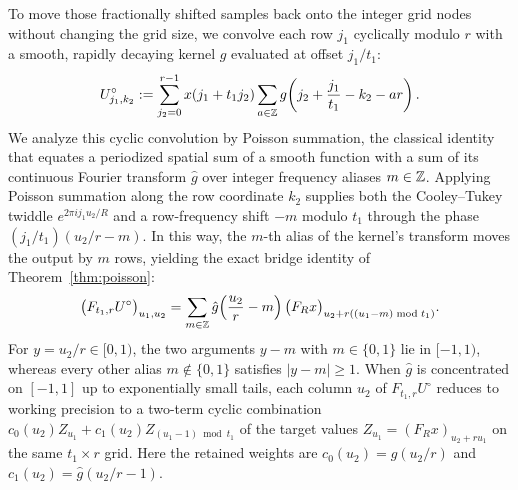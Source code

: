 To move those fractionally shifted samples back onto the integer grid nodes without changing the grid size, we convolve each row $j_1$ cyclically modulo $r$ with a smooth, rapidly decaying kernel $g$ evaluated at offset $j_1 / t_1$:
\[
  U^\circ_{j_1, k_2} := \sum_{j_2=0}^{r-1} x(j_1 + t_1 j_2) \sum_{a \in \mathbb{Z}} g\!\left(j_2 + \frac{j_1}{t_1} - k_2 - a r\right).
\]
We analyze this cyclic convolution by Poisson summation, the classical identity that equates a periodized spatial sum of a smooth function with a sum of its continuous Fourier transform $\hat{g}$ over integer frequency aliases $m \in \mathbb{Z}$. Applying Poisson summation along the row coordinate $k_2$ supplies both the Cooley--Tukey twiddle $e^{2\pi i j_1 u_2 / R}$ and a row-frequency shift $-m$ modulo $t_1$ through the phase $(j_1 / t_1)(u_2 / r - m)$. In this way, the $m$-th alias of the kernel's transform moves the output by $m$ rows, yielding the exact bridge identity of Theorem~\ref{thm:poisson}:
\begin{equation}\label{eq:overview-poisson}
  \bigl(F_{t_1, r} U^\circ\bigr)_{u_1, u_2}
  = \sum_{m \in \mathbb{Z}} \hat{g}\!\left(\frac{u_2}{r} - m\right) \bigl(F_R x\bigr)_{u_2 + r ((u_1 - m)\bmod t_1)}.
\end{equation}
For $y = u_2 / r \in [0, 1)$, the two arguments $y - m$ with $m \in \{0, 1\}$ lie in $[-1, 1)$, whereas every other alias $m \notin \{0, 1\}$ satisfies $|y - m| \ge 1$. When $\hat{g}$ is concentrated on $[-1, 1]$ up to exponentially small tails, each column $u_2$ of $F_{t_1, r} U^\circ$ reduces to working precision to a two-term cyclic combination $c_0(u_2) Z_{u_1} + c_1(u_2) Z_{(u_1 - 1)\bmod t_1}$ of the target values $Z_{u_1} = (F_R x)_{u_2 + r u_1}$ on the same $t_1 \times r$ grid. Here the retained weights are $c_0(u_2) = \hat{g}(u_2 / r)$ and $c_1(u_2) = \hat{g}(u_2 / r - 1)$.

